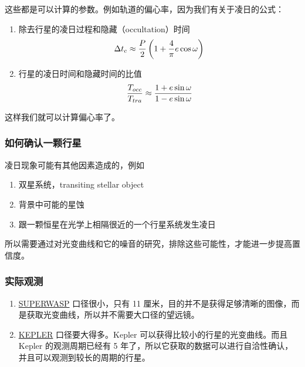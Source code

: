 \documentclass[letterpaper,10pt,english]{sphinxmanual}
\begin{document}
这些都是可以计算的参数。例如轨道的偏心率，因为我们有关于凌日的公式：
\begin{enumerate}
\item {} 
除去行星的凌日过程和隐藏（occultation）时间
\begin{gather}
\begin{split}\Delta t_c \approx \frac{P}{2}\left( 1+\frac{4}{\pi}e\cos\omega \right)\end{split}\notag
\end{gather}
\item {} 
行星的凌日时间和隐藏时间的比值
\begin{gather}
\begin{split}\frac{T_{occ}}{T_{tra}}\approx \frac{1+e\sin\omega}{1-e\sin\omega}\end{split}\notag
\end{gather}
\end{enumerate}

这样我们就可以计算偏心率了。


\subsubsection{如何确认一颗行星}
\label{detection:id11}
凌日现象可能有其他因素造成的，例如
\begin{enumerate}
\item {} 
双星系统，transiting stellar object

\item {} 
背景中可能的星蚀

\item {} 
跟一颗恒星在光学上相隔很近的一个行星系统发生凌日

\end{enumerate}

所以需要通过对光变曲线和它的噪音的研究，排除这些可能性，才能进一步提高置信度。


\subsubsection{实际观测}
\label{detection:id12}\begin{enumerate}
\item {} 
\href{http://www.superwasp.org}{SUPERWASP} 口径很小，只有 11 厘米，目的并不是获得足够清晰的图像，而是获取光变曲线，所以并不需要大口径的望远镜。

\item {} 
\href{http://kepler.nasa.gov/}{KEPLER} 口径要大得多。Kepler 可以获得比较小的行星的光变曲线。而且 Kepler 的观测周期已经有 5 年了，所以它获取的数据可以进行自洽性确认，并且可以观测到较长的周期的行星。

\end{enumerate}
\end{document}
